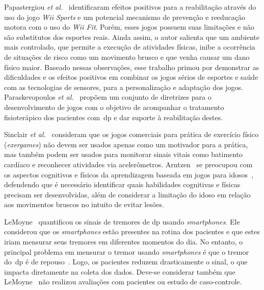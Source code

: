 Papastergiou \textit{et al.}~\cite{Papastergiou:2009:EPC:1570538.1570707} identificaram efeitos positivos para a reabilitação através do uso do jogo \textit{Wii Sports} e um potencial mecanismo de prevenção e reeducação motora com o uso do \textit{Wii Fit}. Porém, esses jogos possuem suas limitações e não são substitutos dos esportes reais. Ainda assim, o autor salienta que um ambiente mais controlado, que permite a execução de atividades físicas, inibe a ocorrência de situações de risco como um movimento brusco e que venha causar um dano físico maior. Baseado nessas observações, esse trabalho primou por demonstrar as dificuldades e os efeitos positivos em combinar os jogos sérios de esportes e saúde com as tecnologias de sensores, para a personalização e adaptação dos jogos. Paraskevopoulos \textit{et al.}~\cite{sacbespoke2014} propõem um conjunto de diretrizes para o desenvolvimento de jogos com o objetivo de acompanhar o tratamento fisioterápico dos pacientes com~\ac{dp} e dar suporte à reabilitação 
destes.

Sinclair \textit{et al.}~\cite{Sinclair:2009:UVB:1515604.1515617} consideram que os jogos comerciais para prática de exercício físico (\textit{exergames}) não devem ser usados apenas como um motivador para a prática, mas também podem ser usados para monitorar sinais vitais como batimento cardíaco e reconhecer atividades via acelerômetros. Arntzen~\cite{arntzen2011} se preocupou com os aspectos cognitivos e físicos da aprendizagem baseada em jogos para idosos~\cite{arntzen2011}, defendendo que é necessário identificar quais habilidades cognitivas e físicas precisam ser desenvolvidas, além de considerar a limitação do idoso em relação aos movimentos bruscos no intuito de evitar lesões.

LeMoyne~\cite{lemoyne2010} quantificou os sinais de tremores de \ac{dp} usando \textit{smartphones}. Ele considerou que os \textit{smartphones} estão presentes na rotina dos pacientes e que estes iriam mensurar seus tremores em diferentes momentos do dia. No entanto, o principal problema em mensurar o tremor usando \textit{smartphones} é que o tremor do~\ac{dp} é de repouso~\cite{jankovic2008}. Logo, os pacientes reduzem drasticamente o sinal, o que impacta diretamente na coleta dos dados. Deve-se considerar também que LeMoyne~\cite{lemoyne2010} não realizou avaliações com pacientes ou estudo de caso-controle. 



